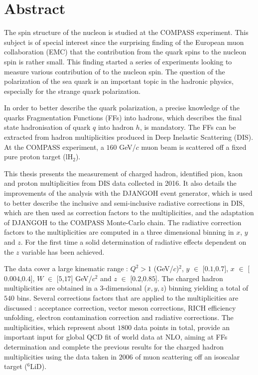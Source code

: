 


\begingroup
\let\clearpage\relax
\let\cleardoublepage\relax
\let\cleardoublepage\relax

\chapter*{Abstract}

The spin structure of the nucleon is studied at the COMPASS experiment. This subject is of special interest since the surprising finding of the European muon collaboration (EMC) that the contribution from the quark spins to the nucleon spin is rather small. This finding started a series of experiments looking to measure various contribution of to the nucleon spin. The question of the polarization of the sea quark is an important topic in the hadronic physics, especially for the strange quark polarization.

In order to better describe the quark polarization, a precise knowledge of the quarks Fragmentation Functions (FFs) into hadrons, which describes the final state hadronisation of quark $q$ into hadron $h$, is mandatory. The FFs can be extracted from hadron multiplicities produced in Deep Inelastic Scattering (DIS). At the COMPASS experiment, a $160$ GeV/$c$ muon beam is scattered off a fixed pure proton target (lH$_2$).

This thesis presents the measurement of charged hadron, identified pion, kaon and proton multiplicities from DIS data collected in 2016. It also details the improvements of the analysis with the DJANGOH event generator, which is used to better describe the inclusive and semi-inclusive radiative corrections in DIS, which are then used as correction factors to the multiplicities, and the adaptation of DJANGOH to the COMPASS Monte-Carlo chain. The radiative correction factors to the multiplicities are computed in a three dimensional binning in $x$, $y$ and $z$. For the first time a solid determination of radiative effects dependent on the $z$ variable has been achieved.

The data cover a large kinematic range : $Q^2 > 1$ (GeV/$c$)$^2$, $y$ $\in$ [$0.1$,$0.7$], $x$ $\in$ [$0.004$,$0.4$], $W$ $\in$ [$5$,$17$] GeV/$c^2$ and $z$ $\in$ [$0.2$,$0.85$]. The charged hadron multiplicities are obtained in a $3$-dimensional ($x,y,z$) binning yielding a total of $540$ bins. Several corrections factors that are applied to the multiplicities are discussed : acceptance correction, vector meson corrections, RICH efficiency unfolding, electron contamination correction and radiative corrections. The multiplicities, which represent about $1800$ data points in total, provide an important input for global QCD fit of world data at NLO, aiming at FFs determination and complete the previous results for the charged hadron multiplicities using the data taken in $2006$ of muon scattering off an isoscalar target ($^6$LiD).

